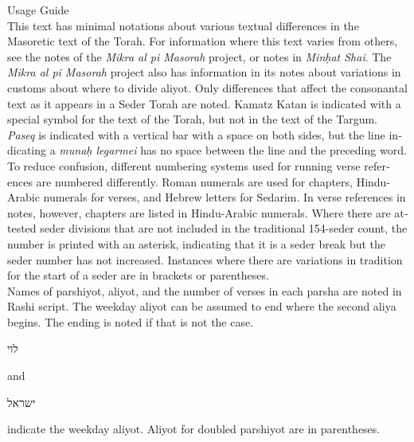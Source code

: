 \clearpage
{}	
\begin{minipage}{\textwidth}\englishfont
	
	\begin{english}
		\vspace{16pt}
		\Large Usage Guide\vspace{12pt}\\
		\normalsize
		This text has minimal notations about various textual differences in the Masoretic text of the Torah. For information where this text varies from others, see the notes of the \textit{Mikra al pi Masorah} project, or notes in \textit{Min\d{h}at Shai}. The \textit{Mikra al pi Masorah} project also has information in its notes about variations in customs about where to divide aliyot. Only differences that affect the consonantal text as it appears in a Seder Torah are noted. Kamatz Katan is indicated with a special symbol for the text of the Torah, but not in the text of the Targum. \textit{Paseq} is indicated with a vertical bar with a space on both sides, but the line indicating a \textit{muna\d{h} legarmei} has no space between the line and the preceding word.\\
		
		To reduce confusion, different numbering systems used for running verse references are numbered differently. Roman numerals are used for chapters, Hindu-Arabic numerals for verses, and Hebrew letters for Sedarim. In verse references in notes, however, chapters are listed in Hindu-Arabic numerals. Where there are attested seder divisions that are not included in the traditional 154-seder count, the number is printed with an asterisk, indicating that it is a seder break but the seder number has not increased. Instances where there are variations in tradition for the start of a seder are in brackets or parentheses.\\
		
		Names of parshiyot, aliyot, and the number of verses in each parsha are noted in Rashi script. The weekday aliyot can be assumed to end where the second aliya begins. The ending is noted if that is not the case.   \begin{hebrew}\footnotesize לוי \normalsize\end{hebrew} and  \begin{hebrew}\footnotesize ישראל\normalsize\end{hebrew} indicate the weekday aliyot. Aliyot for doubled parshiyot are in parentheses.\\
		

\end{english}
\end{minipage}
